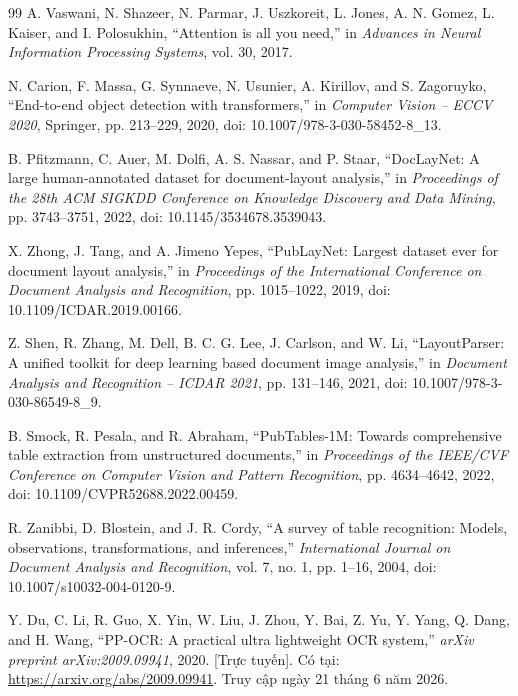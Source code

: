 \documentclass[../DoAn.tex]{subfiles}
\begin{document}
\begin{thebibliography}{99}
A. Vaswani, N. Shazeer, N. Parmar, J. Uszkoreit, L. Jones, A. N. Gomez,
L. Kaiser, and I. Polosukhin,
``Attention is all you need,''
in \emph{Advances in Neural Information Processing Systems},
vol. 30, 2017.

N. Carion, F. Massa, G. Synnaeve, N. Usunier, A. Kirillov, and S. Zagoruyko,
``End-to-end object detection with transformers,''
in \emph{Computer Vision -- ECCV 2020},
Springer, pp. 213--229, 2020,
doi: 10.1007/978-3-030-58452-8\_13.

B. Pfitzmann, C. Auer, M. Dolfi, A. S. Nassar, and P. Staar,
``DocLayNet: A large human-annotated dataset for document-layout analysis,''
in \emph{Proceedings of the 28th ACM SIGKDD Conference on Knowledge
Discovery and Data Mining},
pp. 3743--3751, 2022,
doi: 10.1145/3534678.3539043.

X. Zhong, J. Tang, and A. Jimeno Yepes,
``PubLayNet: Largest dataset ever for document layout analysis,''
in \emph{Proceedings of the International Conference on Document Analysis
and Recognition},
pp. 1015--1022, 2019,
doi: 10.1109/ICDAR.2019.00166.

Z. Shen, R. Zhang, M. Dell, B. C. G. Lee, J. Carlson, and W. Li,
``LayoutParser: A unified toolkit for deep learning based document image
analysis,''
in \emph{Document Analysis and Recognition -- ICDAR 2021},
pp. 131--146, 2021,
doi: 10.1007/978-3-030-86549-8\_9.

B. Smock, R. Pesala, and R. Abraham,
``PubTables-1M: Towards comprehensive table extraction from unstructured
documents,''
in \emph{Proceedings of the IEEE/CVF Conference on Computer Vision and
Pattern Recognition},
pp. 4634--4642, 2022,
doi: 10.1109/CVPR52688.2022.00459.

R. Zanibbi, D. Blostein, and J. R. Cordy,
``A survey of table recognition: Models, observations, transformations, and
inferences,''
\emph{International Journal on Document Analysis and Recognition},
vol. 7, no. 1, pp. 1--16, 2004,
doi: 10.1007/s10032-004-0120-9.

Y. Du, C. Li, R. Guo, X. Yin, W. Liu, J. Zhou, Y. Bai, Z. Yu, Y. Yang,
Q. Dang, and H. Wang,
``PP-OCR: A practical ultra lightweight OCR system,''
\emph{arXiv preprint arXiv:2009.09941}, 2020. [Trực tuyến]. Có tại:
\url{https://arxiv.org/abs/2009.09941}.
Truy cập ngày 21 tháng 6 năm 2026.


\end{thebibliography}
\end{document}
